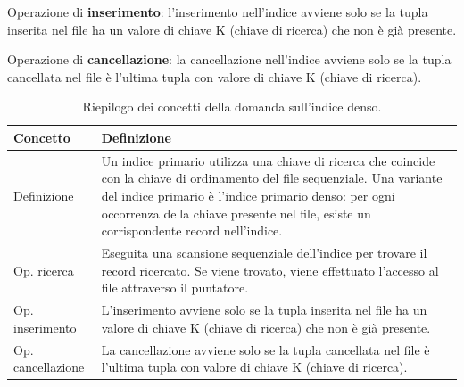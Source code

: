 \documentclass[a4paper]{article}
\begin{document}
\begin{enumerate}
		\noindent
		Operazione di \textbf{inserimento}: l'inserimento nell'indice avviene solo se la tupla inserita nel file ha un valore di chiave K (chiave di ricerca) che non è già presente.
		
		Operazione di \textbf{cancellazione}: la cancellazione nell'indice avviene solo se la tupla cancellata nel file è l'ultima tupla con valore di chiave K (chiave di ricerca).\newpage
		
		\begin{table}[!htp]
			\centering
			\begin{tabular}{@{} l p{25em} @{}}
				\toprule
				Concetto & Definizione \\
				\midrule
				Definizione 		& Un indice primario utilizza una chiave di ricerca che coincide con la chiave di ordinamento del file sequenziale. Una variante del indice primario è l'indice primario denso: per ogni occorrenza della chiave presente nel file, esiste un corrispondente record nell'indice. \\ [.5em]
				Op. ricerca 		& Eseguita una scansione sequenziale dell'indice per trovare il record ricercato. Se viene trovato, viene effettuato l'accesso al file attraverso il puntatore. \\ [.5em]
				Op. inserimento		& L'inserimento avviene solo se la tupla inserita nel file ha un valore di chiave K (chiave di ricerca) che non è già presente. \\ [.5em]
				Op. cancellazione	& La cancellazione avviene solo se la tupla cancellata nel file è l'ultima tupla con valore di chiave K (chiave di ricerca). \\
				\bottomrule
			\end{tabular}
			\caption{Riepilogo dei concetti della domanda sull'indice denso.}
		\end{table}
	\end{enumerate}\newpage
	
\end{document}
